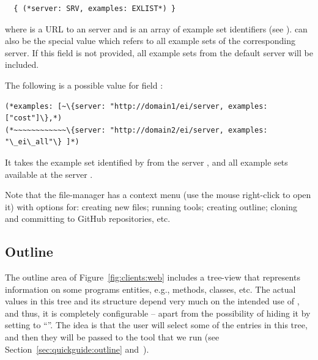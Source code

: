 \bigskip
\begin{lstlisting}
  { (*server: SRV, examples: EXLIST*) } 
\end{lstlisting}

\bigskip
\noindent
where  is a URL to an \ei server and  is an array
of example set identifiers (see ).
%
 can also be the special value  which refers
to all example sets of the corresponding server.
%
If this field is not provided, all example sets from the default
server will be included.

\begin{example}
The following is a possible value for field :

\medskip
\begin{lstlisting}
(*examples: [~\{server: "http://domain1/ei/server, examples: ["cost"]\},*)
(*~~~~~~~~~~~~\{server: "http://domain2/ei/server, examples: "\_ei\_all"\} ]*)
\end{lstlisting}

\medskip
\noindent
It takes the example set identified by  from the \ei server
, and all example sets available at the
\ei server .

\end{example}


Note that the file-manager has a context menu (use the mouse
right-click to open it) with options for: creating new files; running
tools; creating outline; cloning and committing to GitHub
repositories, etc.

\subsection{Outline}
\label{sec:clients:web:outline}

The outline area of Figure~\ref{fig:clients:web} includes a tree-view
that represents information on some programs entities, e.g., methods,
classes, etc. The actual values in this tree and its structure depend
very much on the intended use of \ei, and thus, it is completely
configurable -- apart from the possibility of hiding it by setting
 to ``''.
%
The idea is that the user will select some of the entries in this
tree, and then they will be passed to the tool that we run (see
Section~\ref{sec:quickguide:outline}
and~).


